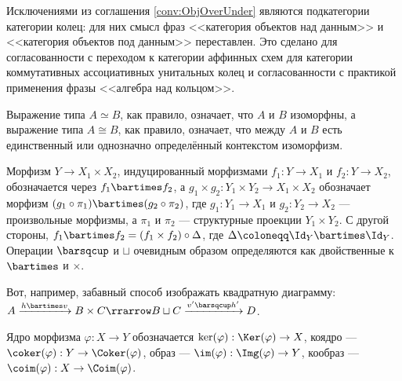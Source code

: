 \documentclass[
	extrafontsizes,
	11pt,
	hyphens,
]{memoir}
\begin{document}
\begin{convention}
Исключениями из соглашения \ref{conv:ObjOverUnder} являются подкатегории категории колец: для них смысл фраз <<категория объектов над данным>> и <<категория объектов под данным>> переставлен.
Это сделано для согласованности с переходом к категории аффинных схем для категории коммутативных ассоциативных унитальных колец и согласованности с практикой применения фразы <<алгебра над кольцом>>.
\end{convention}

\begin{notation}
Выражение типа \(A \simeq B\), как правило, означает, что \(A\) и \(B\) изоморфны, а выражение типа \(A \cong B\), как правило, означает, что между \(A\) и \(B\) есть единственный или однозначно определённый контекстом изоморфизм.
\end{notation}

\begin{notation}
\label{not:MorProdCoprod}
Морфизм \(Y \to X_1 \times X_2\), индуцированный морфизмами \(f_1: Y \to X_1\) и \(f_2 : Y \to X_2\),
обозначается через \(f_1 \bartimes f_2\),
а \(g_1 \times g_2 : Y_1 \times Y_2 \to X_1 \times X_2\) обозначает морфизм \((g_1 \circ \pi_1) \bartimes (g_2 \circ \pi_2)\), где \(g_1 : Y_1 \to X_1\) и \(g_2 : Y_2 \to X_2\) --- произвольные морфизмы, а \(\pi_1\) и \(\pi_2\) --- структурные проекции \(Y_1 \times Y_2\).
С другой стороны, \(f_1 \bartimes f_2 = (f_1 \times f_2) \circ \Delta\), где \(\Delta \coloneqq \Id_Y \bartimes \Id_Y\).
Операции \(\barsqcup\) и \(\sqcup\) очевидным образом определяются как двойственные к \(\bartimes\) и \(\times\).
\end{notation}

\begin{example}
Вот, например, забавный способ изображать квадратную диаграмму:
\(A \xrightarrow{h \bartimes v} B \times C \rrarrow B \sqcup C \xrightarrow{v' \barsqcup h'} D\).
\end{example}

\begin{notation}
Ядро морфизма \(\varphi : X \to Y\) обозначается \(\ker(\varphi) : \Ker(\varphi) \to X\),
коядро --- \(\coker(\varphi) : Y \to \Coker(\varphi)\),
образ --- \(\im(\varphi) : \Img(\varphi) \to Y\),
кообраз --- \(\coim(\varphi) : X \to \Coim(\varphi)\).
\end{notation}
\end{document}
